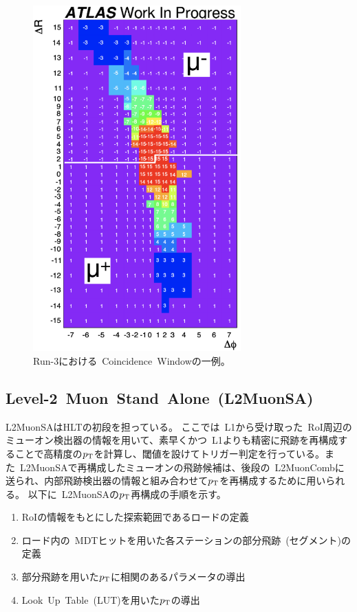 \begin{figure}[h]
  \centering
  \includegraphics[clip, width=8cm]{fig/3/Run3CW.pdf}
  \caption{Run-3における~Coincidence~Windowの一例\cite{article:shiomi}。}
  \label{fig:3-5}
\end{figure}


\subsection{Level-2~Muon~Stand~Alone~(L2MuonSA)}\label{chapter3-2-2}
L2MuonSAはHLTの初段を担っている。
ここでは~L1から受け取った~RoI周辺のミューオン検出器の情報を用いて、素早くかつ~L1よりも精密に飛跡を再構成することで高精度の$p_\mathrm{T}$を計算し、閾値を設けてトリガー判定を行っている。また~L2MuonSAで再構成したミューオンの飛跡候補は、後段の~L2MuonCombに送られ、内部飛跡検出器の情報と組み合わせて$p_\mathrm{T}$を再構成するために用いられる。
以下に~L2MuonSAの$p_\mathrm{T}$再構成の手順を示す。
\begin{enumerate}
    \item RoIの情報をもとにした探索範囲であるロードの定義
    \item ロード内の~MDTヒットを用いた各ステーションの部分飛跡~(セグメント)の定義
    \item 部分飛跡を用いた$p_\mathrm{T}$に相関のあるパラメータの導出
    \item Look~Up~Table~(LUT)を用いた$p_\mathrm{T}$の導出
\end{enumerate}

